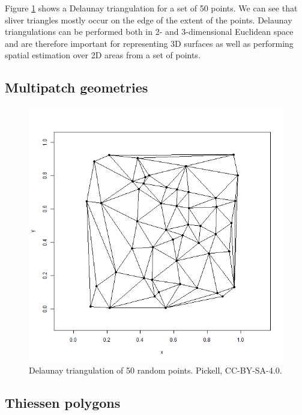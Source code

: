 \documentclass[
]{book}
\begin{document}
Figure \ref{fig:7-delaunay-triangulation} shows a Delaunay triangulation for a set of 50 points. We can see that sliver triangles mostly occur on the edge of the extent of the points. Delaunay triangulations can be performed both in 2- and 3-dimensional Euclidean space and are therefore important for representing 3D surfaces as well as performing spatial estimation over 2D areas from a set of points.

\hypertarget{multipatch-geometries}{%
\subsection{Multipatch geometries}\label{multipatch-geometries}}

\begin{figure}
\includegraphics[width=0.75\linewidth]{images/07-delaunay-triangulation} \caption{Delaunay triangulation of 50 random points. Pickell, CC-BY-SA-4.0.}\label{fig:7-delaunay-triangulation}
\end{figure}

\hypertarget{thiessen-polygons-1}{%
\subsection{Thiessen polygons}\label{thiessen-polygons-1}}
\end{document}
